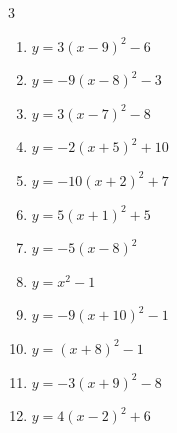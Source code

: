 \begin{multicols}{3}
\begin{enumerate}
  \item $\displaystyle y=3\left( x-9\right)^{2}-6$

        \phantom{$\displaystyle 頂点\left( 9 , -6 \right)$}

  \item $\displaystyle y=-9\left( x-8\right)^{2}-3$

        \phantom{$\displaystyle 頂点\left( 8 , -3 \right)$}

  \item $\displaystyle y=3\left( x-7\right)^{2}-8$

        \phantom{$\displaystyle 頂点\left( 7 , -8 \right)$}

  \item $\displaystyle y=-2\left( x+5\right)^{2}+10$

        \phantom{$\displaystyle 頂点\left( -5 , 10 \right)$}

  \item $\displaystyle y=-10\left( x+2\right)^{2}+7$

        \phantom{$\displaystyle 頂点\left( -2 , 7 \right)$}

  \item $\displaystyle y=5\left( x+1\right)^{2}+5$

        \phantom{$\displaystyle 頂点\left( -1 , 5 \right)$}

  \item $\displaystyle y=-5\left( x-8\right)^{2}$

        \phantom{$\displaystyle 頂点\left( 8 , 0 \right)$}

  \item $\displaystyle y=x^{2}-1$

        \phantom{$\displaystyle 頂点\left( 0 , -1 \right)$}

  \item $\displaystyle y=-9\left( x+10\right)^{2}-1$

        \phantom{$\displaystyle 頂点\left( -10 , -1 \right)$}

  \item $\displaystyle y=\left( x+8\right)^{2}-1$

        \phantom{$\displaystyle 頂点\left( -8 , -1 \right)$}

  \item $\displaystyle y=-3\left( x+9\right)^{2}-8$

        \phantom{$\displaystyle 頂点\left( -9 , -8 \right)$}

  \item $\displaystyle y=4\left( x-2\right)^{2}+6$


\end{enumerate}
\end{multicols}
